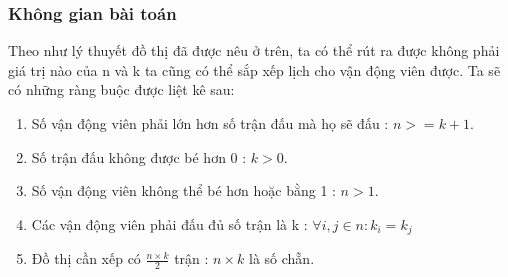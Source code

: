 \documentclass[13pt,a4paper]{article}
\begin{document}
\subsubsection{Không gian bài toán}
Theo như lý thuyết đồ thị đã được nêu ở trên, ta có thể rút ra được không phải giá trị nào của n và k ta cũng có thể sắp xếp lịch cho vận động viên được. Ta sẽ có những ràng buộc được liệt kê sau:
\begin{enumerate}
	\item Số vận động viên phải lớn hơn số trận đấu mà họ sẽ đấu : $n >= k+1 $.
	\item Số trận đấu không được bé hơn 0 : $k > 0$.
	\item Số vận động viên không thể bé hơn hoặc bằng 1 : $n > 1$.
	\item Các vận động viên phải đấu đủ số trận là k : $\forall i,j \in n : k_i = k_j$
	\item Đồ thị cần xếp có $\frac{n \times k}{2} $ trận : $n \times k$ là số chẵn.
\end{enumerate}
\newpage
\end{document}

